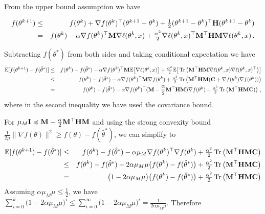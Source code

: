 From the upper bound assumption we have

\begin{eqnarray*}
f(\theta^{k+1}) &\le& f(\theta^{k}) + \nabla f(\theta^k)^\top (\theta^{k+1} - \theta^k) + \tfrac{1}{2} (\theta^{k+1} - \theta^k)^\top {\mathbf{H}} (\theta^{k+1} - \theta^k)\\
&=& f(\theta^{k}) - \alpha \nabla f(\theta^{k})^\top {\mathbf{M}} \nabla \ell(\theta^k, x) + \tfrac{\alpha^2}{2} \nabla \ell(\theta^k, x)^\top {\mathbf{M}}^\top {\mathbf{H}} {\mathbf{M}} \nabla \ell(\theta^k, x)\,. \\
\end{eqnarray*}

Subtracting $f(\theta^\ast)$ from both sides and taking conditional expectation we have
\begin{eqnarray*}
\mathbb{E} [ f(\theta^{k+1}) - f(\hat\theta^\ast)] &\le&  f(\theta^{k}) - f(\hat\theta^\ast) -\alpha \nabla f(\theta^{k})^\top {\mathbf{M}}\mathbb{E} \big[ \nabla \ell(\theta^k, x) \big] + \tfrac{\alpha^2}{2} \mathbb{E} \big[ \operatorname{Tr} \big({\mathbf{M}}^\top {\mathbf{H}} {\mathbf{M}} \nabla \ell(\theta^k, x) \nabla \ell(\theta^k, x)^\top  \big) \big] \\
 &\leq&  f(\theta^{k}) - f(\hat\theta^\ast) -\alpha \nabla f(\theta^{k})^\top {\mathbf{M}} \nabla f(\theta^{k}) + \tfrac{\alpha^2}{2} \operatorname{Tr} \big({\mathbf{M}}^\top {\mathbf{H}} {\mathbf{M}} ({\mathbf{C}} + \nabla f(\theta^k) \nabla f(\theta^k)) \big)  \\
 &=&  f(\theta^{k}) - f(\hat\theta^\ast) -\alpha \nabla f(\theta^{k})^\top ({\mathbf{M}} - \frac{\alpha}{2} {\mathbf{M}}^\top {\mathbf{H}} {\mathbf{M}}) \nabla f(\theta^{k}) + \tfrac{\alpha^2}{2} \operatorname{Tr} \big({\mathbf{M}}^\top {\mathbf{H}} {\mathbf{M}} {\mathbf{C}}) \big)~,
\end{eqnarray*}
where in the second inequality we have used the covariance bound.

For $\mu_{M} {\mathbf{I}} \preccurlyeq {\mathbf{M}} - \frac{\alpha}{2} {\mathbf{M}}^\top {\mathbf{H}} {\mathbf{M}}$ and using the strong convexity bound $\tfrac{1}{2 \mu} \| \nabla f(\theta) \|^2 \ge f(\theta) - f(\hat\theta^\ast)$, we can simplify to 
\begin{eqnarray*}
\mathbb{E} [ f(\theta^{k+1}) - f(\hat\theta^\ast)] &\le&  f(\theta^{k}) - f(\hat\theta^\ast) -\alpha \mu_M \nabla f(\theta^{k})^\top \nabla f(\theta^{k}) + \tfrac{\alpha^2}{2} \operatorname{Tr} \big({\mathbf{M}}^\top {\mathbf{H}} {\mathbf{M}} {\mathbf{C}} \big)  \\
&\le& f(\theta^{k}) - f(\hat\theta^\ast) -2 \alpha \mu_M \mu  \big( f(\theta^{k}) - f(\hat\theta^\ast)\big)  + \tfrac{\alpha^2}{2} \operatorname{Tr} \big({\mathbf{M}}^\top {\mathbf{H}} {\mathbf{M}} {\mathbf{C}} \big)  \\
&=& \big(1 -2 \alpha \mu_M \mu\big)  \big( f(\theta^{k}) - f(\hat\theta^\ast)\big)  + \tfrac{\alpha^2}{2} \operatorname{Tr} \big({\mathbf{M}}^\top {\mathbf{H}} {\mathbf{M}} {\mathbf{C}} \big)  \\
\end{eqnarray*}
Assuming $ \alpha \mu_M \mu \le \frac{1}{2}$, we have $\sum_{i=0}^k \big(1 -2 \alpha \mu_M \mu\big)^i \le \sum_{i=0}^\infty \big(1 -2 \alpha \mu_M \mu\big)^i = \frac{1}{2 \alpha \mu_M \mu} $. Therefore





